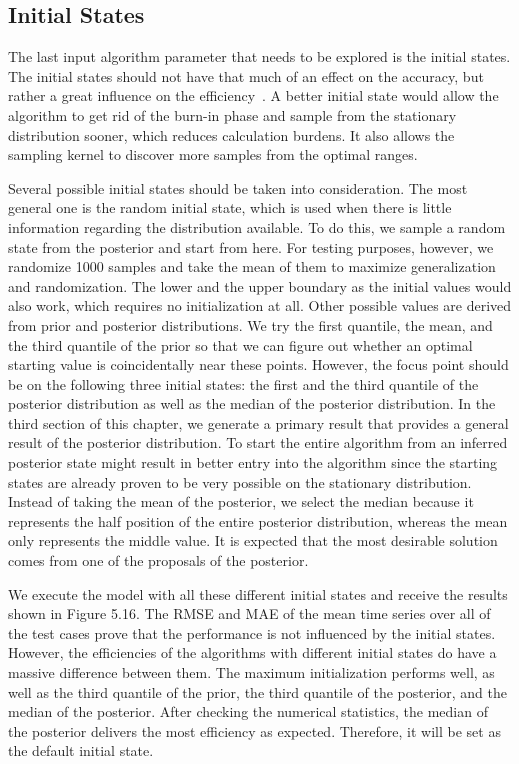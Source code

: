 \subsection{Initial States}
The last input algorithm parameter that needs to be explored is the initial states. The initial states should not have that much of an effect on the accuracy, but rather a great influence on the efficiency~\cite{mcmc_practice}. A better initial state would allow the algorithm to get rid of the burn-in phase and sample from the stationary distribution sooner, which reduces calculation burdens. It also allows the sampling kernel to discover more samples from the optimal ranges.

Several possible initial states should be taken into consideration. The most general one is the random initial state, which is used when there is little information regarding the distribution available. To do this, we sample a random state from the posterior and start from here. For testing purposes, however, we randomize 1000 samples and take the mean of them to maximize generalization and randomization. The lower and the upper boundary as the initial values would also work, which requires no initialization at all. Other possible values are derived from prior and posterior distributions. We try the first quantile, the mean, and the third quantile of the prior so that we can figure out whether an optimal starting value is coincidentally near these points. However, the focus point should be on the following three initial states: the first and the third quantile of the posterior distribution as well as the median of the posterior distribution. In the third section of this chapter, we generate a primary result that provides a general result of the posterior distribution. To start the entire algorithm from an inferred posterior state might result in better entry into the algorithm since the starting states are already proven to be very possible on the stationary distribution. Instead of taking the mean of the posterior, we select the median because it represents the half position of the entire posterior distribution, whereas the mean only represents the middle value. It is expected that the most desirable solution comes from one of the proposals of the posterior.

We execute the model with all these different initial states and receive the results shown in Figure 5.16. The RMSE and MAE of the mean time series over all of the test cases prove that the performance is not influenced by the initial states. However, the efficiencies of the algorithms with different initial states do have a massive difference between them. The maximum initialization performs well, as well as the third quantile of the prior, the third quantile of the posterior, and the median of the posterior. After checking the numerical statistics, the median of the posterior delivers the most efficiency as expected. Therefore, it will be set as the default initial state.

